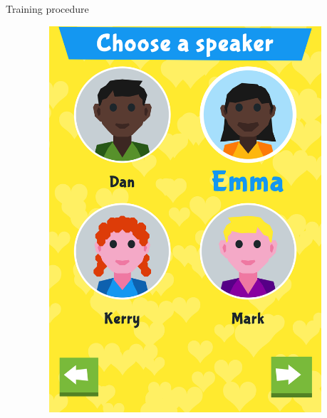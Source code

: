 \documentclass[final,xcolor={cmyk,hyperref}]{beamer}
\begin{document}
\begin{frame}[t]
\begin{columns}[t]
\begin{column}{0.45\linewidth}
\begin{block}{Training procedure}
\begin{figure}[h]
\begin{columns}
\begin{column}{\screenshotwidth}
  \end{column}
  \begin{column}{\screenshotwidth}
    \includegraphics[width=\linewidth]{images/CALVin-screenshots/jpgs/choose_talker}
  \end{column}
  \begin{column}{\screenshotwidth}

\end{column}
\end{columns}
\end{figure}
\end{block}
\end{column}
\end{columns}
\end{frame}
\end{document}
